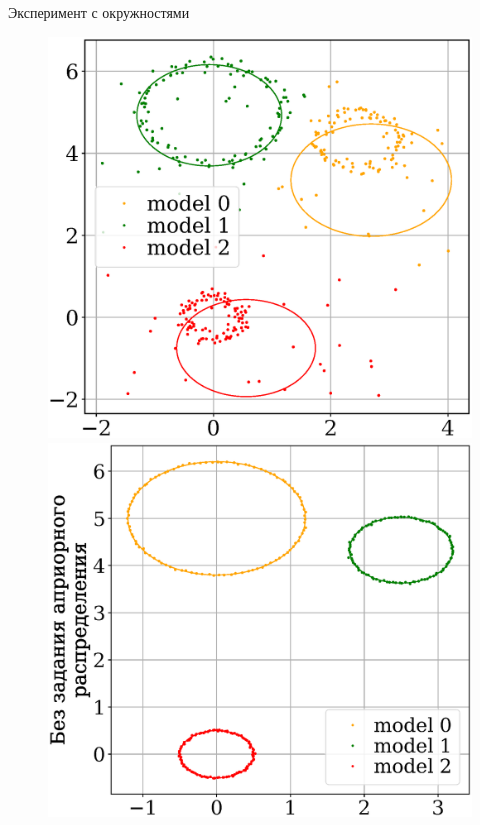 \documentclass[10pt,pdf,hyperref={unicode}]{beamer}
\begin{document}
\begin{frame}{Эксперимент с окружностями}
\begin{figure}[h!]
\begin{minipage}{.25\textwidth}
\end{minipage}
\begin{minipage}{.25\textwidth}
\vspace{-2.mm}
\hspace{-4.5mm}
      \includegraphics[width =  1.07\textwidth]{figures/902.eps}
\end{minipage}
\begin{minipage}{.25\textwidth}
      \includegraphics[width =  1.0\textwidth]{figures/900.eps}

\end{minipage}
\end{figure}
\end{frame}
\end{document}

